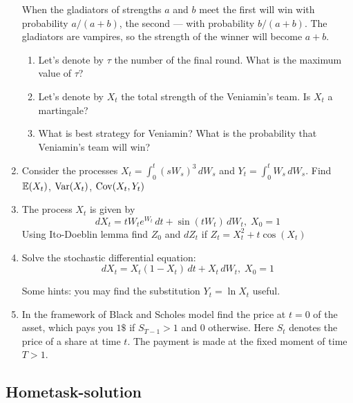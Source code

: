 \documentclass[pdftex,12pt,a4paper]{article}
\begin{document}
\begin{enumerate}
When the gladiators of strengths $a$ and $b$ meet the first will win with probability $a/(a+b)$, the second --- with probability $b/(a+b)$. The gladiators are vampires, so the strength of the winner will become $a+b$.

\begin{enumerate}
\item Let's denote by $\tau$ the number of the final round. What is the maximum value of $\tau$?
\item Let's denote by $X_t$ the total strength of the Veniamin's team. Is $X_t$ a martingale?
\item What is best strategy for Veniamin? What is the probability that Veniamin's team will win?
\end{enumerate}


\item Consider the processes $X_t=\int_0^t (s W_s)^3 \,dW_s$ and $Y_t=\int_0^t W_s \, dW_s$. Find $\mathbb{E}(X_t)$, $\operatorname{Var}(X_t)$, $\operatorname{Cov}(X_t,Y_t)$

\item The process $X_t$ is given by
\[
dX_t=tW_t e^{W_t} \, dt + \sin (tW_t) \, dW_t, \; X_0=1
\]
Using Ito-Doeblin lemma find $Z_0$ and $dZ_t$ if $Z_t=X_t^2+t\cos (X_t)$

\item Solve the stochastic differential equation:
\[
dX_t=X_t(1-X_t) \, dt+X_t \, dW_t, \; X_0=1
\]

Some hints: you may find the substitution $Y_t = \ln X_t$ useful.

\item In the framework of Black and Scholes model find the price at $t=0$ of the asset, which pays you $1 \$ $  if $S_{T-1}>1$ and $0$ otherwise. Here $S_t$ denotes the price of a share at time $t$. The payment is made at the fixed moment of time $T >1$.

\end{enumerate}


\subsection{Hometask-solution}
\end{document}
